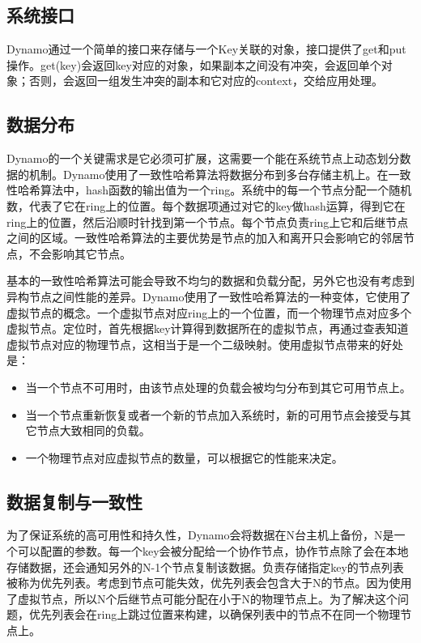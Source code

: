 \documentclass[UTF8]{article}
\begin{document}
	\subsection{系统接口}
		Dynamo通过一个简单的接口来存储与一个Key关联的对象，接口提供了get和put操作。get(key)会返回key对应的对象，如果副本之间没有冲突，会返回单个对象；否则，会返回一组发生冲突的副本和它对应的context，交给应用处理。

	\subsection{数据分布}
		Dynamo的一个关键需求是它必须可扩展，这需要一个能在系统节点上动态划分数据的机制。Dynamo使用了一致性哈希算法将数据分布到多台存储主机上。在一致性哈希算法中，hash函数的输出值为一个ring。系统中的每一个节点分配一个随机数，代表了它在ring上的位置。每个数据项通过对它的key做hash运算，得到它在ring上的位置，然后沿顺时针找到第一个节点。每个节点负责ring上它和后继节点之间的区域。一致性哈希算法的主要优势是节点的加入和离开只会影响它的邻居节点，不会影响其它节点。

		基本的一致性哈希算法可能会导致不均匀的数据和负载分配，另外它也没有考虑到异构节点之间性能的差异。Dynamo使用了一致性哈希算法的一种变体，它使用了虚拟节点的概念。一个虚拟节点对应ring上的一个位置，而一个物理节点对应多个虚拟节点。定位时，首先根据key计算得到数据所在的虚拟节点，再通过查表知道虚拟节点对应的物理节点，这相当于是一个二级映射。使用虚拟节点带来的好处是：
		\begin{itemize}
			\item
				当一个节点不可用时，由该节点处理的负载会被均匀分布到其它可用节点上。
			\item
                     当一个节点重新恢复或者一个新的节点加入系统时，新的可用节点会接受与其它节点大致相同的负载。
                \item
                     一个物理节点对应虚拟节点的数量，可以根据它的性能来决定。
		\end{itemize}
	
	\subsection{数据复制与一致性}
		为了保证系统的高可用性和持久性，Dynamo会将数据在N台主机上备份，N是一个可以配置的参数。每一个key会被分配给一个协作节点，协作节点除了会在本地存储数据，还会通知另外的N-1个节点复制该数据。负责存储指定key的节点列表被称为优先列表。考虑到节点可能失效，优先列表会包含大于N的节点。因为使用了虚拟节点，所以N个后继节点可能分配在小于N的物理节点上。为了解决这个问题，优先列表会在ring上跳过位置来构建，以确保列表中的节点不在同一个物理节点上。
\end{document}
